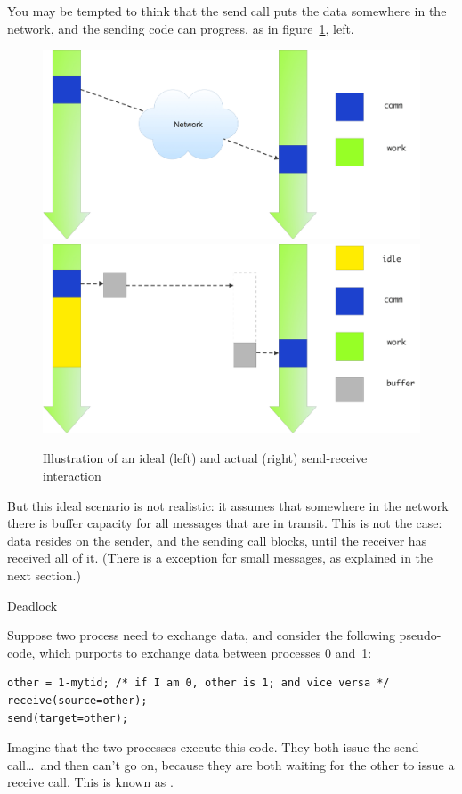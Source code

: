 You may be tempted to think that the send call puts the data somewhere
in the network, and the sending code can progress,
as in figure~\ref{fig:send-ideal}, left.
%
\begin{figure}[ht]
\leavevmode
\includegraphics[scale=.08]{graphics/send-ideal}
\includegraphics[scale=.08]{graphics/send-blocking}
\caption{Illustration of an ideal (left) and actual (right) send-receive interaction}
\label{fig:send-ideal}
\end{figure}
%
But this ideal scenario is not realistic: it assumes that somewhere
in the network there is buffer capacity for all messages that are in
transit.
This is not the case: data resides on the sender, and the sending call blocks,
until the receiver has received all of it. (There is a exception for
small messages, as explained in the next section.)

 {Deadlock}

Suppose two process need to exchange data, and consider the following
pseudo-code, which purports to exchange data between processes 0 and~1:
\begin{lstlisting}
other = 1-mytid; /* if I am 0, other is 1; and vice versa */
receive(source=other);
send(target=other);
\end{lstlisting}
Imagine that the two processes execute this code. They both issue the
send call\ldots\ and then can't go on, because they are both waiting
for the other to issue a receive call. This is known
as .

